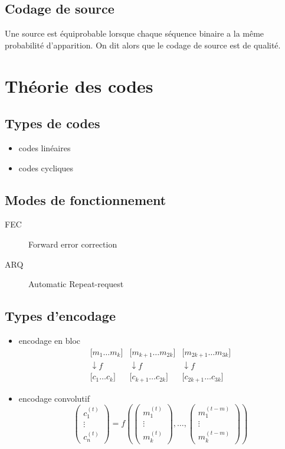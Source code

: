 \documentclass[a4paper,10pt]{leaflet}
\begin{document}
\subsection{Codage de source}
Une source est équiprobable lorsque chaque séquence binaire a la même probabilité d'apparition.
On dit alors que le codage de source est de qualité.

\section{Théorie des codes}

\subsection{Types de codes}
\begin{itemize}
 \item codes linéaires
 \item codes cycliques
\end{itemize}

\subsection{Modes de fonctionnement}
\begin{description}
 \item[FEC] Forward error correction
 \item[ARQ] Automatic Repeat-request
\end{description}

\subsection{Types d'encodage}
\begin{itemize}
 \item encodage en bloc
$$
\begin{array}{ccc}
 \lbrack m_1 \ldots m_k] & \lbrack m_{k+1} \ldots m_{2k}] & \lbrack m_{2k+1} \ldots m_{3k}]\\
 \downarrow f & \downarrow f & \downarrow f \\
 \lbrack c_1 \ldots c_k] & \lbrack c_{k+1} \ldots c_{2k}] & \lbrack c_{2k+1} \ldots c_{3k}]
\end{array}
$$
 \item encodage convolutif
$$
\left(\begin{array}{c}
 c_1^{(t)}\\
 \vdots \\
 c_n^{(t)}
\end{array}\right)
= f \left(
\left(\begin{array}{c}
 m_1^{(t)}\\
 \vdots \\
 m_k^{(t)}
\end{array}\right)
, \ldots, 
\left(\begin{array}{c}
 m_1^{(t-m)}\\
 \vdots \\
 m_k^{(t-m)}
\end{array}\right)
\right)
$$
\end{itemize}
\end{document}
